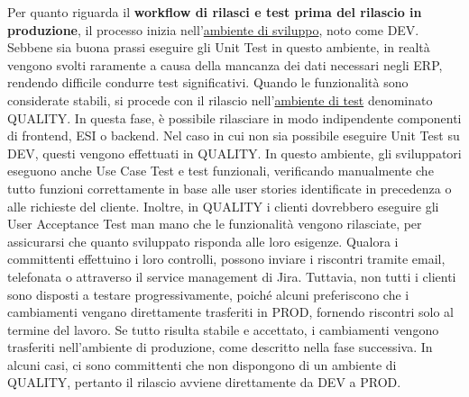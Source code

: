         Per quanto riguarda il \textbf{workflow di rilasci e test prima del rilascio in produzione}, il processo inizia nell'\underline{ambiente di sviluppo}, noto come DEV.
        Sebbene sia buona prassi eseguire gli Unit Test in questo ambiente, in realtà vengono svolti raramente a causa della mancanza dei dati necessari negli \ac{ERP},
        rendendo difficile condurre test significativi. Quando le funzionalità sono considerate stabili, si procede con il rilascio nell'\underline{ambiente di test} denominato
        QUALITY. In questa fase, è possibile rilasciare in modo indipendente componenti di frontend, \ac{ESI} o backend. Nel caso in cui non sia possibile eseguire Unit
        Test su DEV, questi vengono effettuati in QUALITY. In questo ambiente, gli sviluppatori eseguono anche Use Case
        Test e test funzionali, verificando manualmente che tutto funzioni correttamente in base alle user stories identificate in precedenza o alle richieste del cliente.
        Inoltre, in QUALITY i clienti dovrebbero eseguire gli User Acceptance Test man mano che le funzionalità vengono rilasciate, per assicurarsi che quanto sviluppato
        risponda alle loro esigenze. Qualora i committenti effettuino i loro controlli, possono inviare i riscontri tramite email, telefonata o attraverso il service
        management di Jira. Tuttavia, non tutti i clienti sono disposti a testare progressivamente, poiché alcuni preferiscono che i cambiamenti vengano direttamente
        trasferiti in PROD, fornendo riscontri solo al termine del lavoro. Se tutto risulta stabile e accettato, i cambiamenti vengono trasferiti nell'ambiente di produzione,
        come descritto nella fase successiva. In alcuni casi, ci sono
        committenti che non dispongono di un ambiente di QUALITY, pertanto il rilascio avviene direttamente da DEV a PROD.

